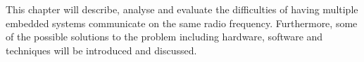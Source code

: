 This chapter will describe, analyse and evaluate the difficulties of having multiple embedded systems communicate on the same radio frequency.
Furthermore, some of the possible solutions to the problem including hardware, software and techniques will be introduced and discussed.
